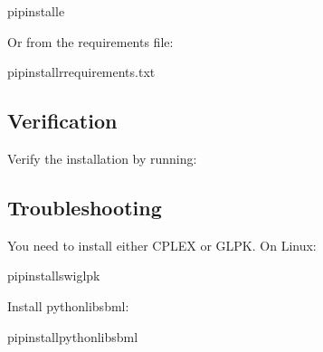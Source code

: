 \documentclass[letterpaper,12pt,english]{sphinxmanual}
\begin{document}
\begin{sphinxVerbatim}[commandchars=\\\{\}]
pipinstall\PYGZhy{}e
\end{sphinxVerbatim}

\sphinxAtStartPar
Or from the requirements file:

\begin{sphinxVerbatim}[commandchars=\\\{\}]
pipinstall\PYGZhy{}rrequirements.txt
\end{sphinxVerbatim}


\subsection{Verification}
\label{\detokenize{installation:verification}}
\sphinxAtStartPar
Verify the installation by running:

\begin{sphinxVerbatim}[commandchars=\\\{\}]
  
\end{sphinxVerbatim}


\subsection{Troubleshooting}
\label{\detokenize{installation:troubleshooting}}
\sphinxAtStartPar
{}

\sphinxAtStartPar
You need to install either CPLEX or GLPK. On Linux:

\begin{sphinxVerbatim}[commandchars=\\\{\}]
pipinstallswiglpk
\end{sphinxVerbatim}

\sphinxAtStartPar
{}

\sphinxAtStartPar
Install python\sphinxhyphen{}libsbml:

\begin{sphinxVerbatim}[commandchars=\\\{\}]
pipinstallpython\PYGZhy{}libsbml
\end{sphinxVerbatim}
\end{document}
